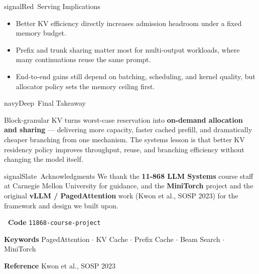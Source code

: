 \documentclass[17pt]{extarticle}
\newlength{\PosterColumnHeight}
\newcommand{\bodycopy}{\fontsize{31.5}{36.8}\selectfont}
\newcommand{\blockgap}{\par\vspace{1.2mm plus 0.55fill}}
\newenvironment{postercolumn}{%
\begin{minipage}[t][\PosterColumnHeight][s]{0.321\linewidth}
\vspace{0pt}%
}{%
\end{minipage}%
}
\begin{document}
\begin{postercolumn}
\blockgap

\begin{posterbox}{signalRed}{\faServer\ Serving Implications}
\bodycopy
\begin{itemize}
      \item Better KV efficiency directly increases admission headroom under a fixed memory budget.
      \item Prefix and trunk sharing matter most for multi-output workloads, where many continuations reuse the same prompt.
      \item End-to-end gains still depend on batching, scheduling, and kernel quality, but allocator policy sets the memory ceiling first.
\end{itemize}
\end{posterbox}

\blockgap

\begin{posterbox}{navyDeep}{\faFlag\ Final Takeaway}
{\fontsize{30}{36}\selectfont
Block-granular KV turns worst-case reservation into \textbf{on-demand allocation and sharing} --- delivering more capacity, faster cached prefill, and dramatically cheaper branching from one mechanism. The systems lesson is that better KV residency policy improves throughput, reuse, and branching efficiency without changing the model itself.\par}
\end{posterbox}

\blockgap

\begin{posterbox}{signalSlate}{\faHandshake\ Acknowledgments}
\bodycopy
We thank the \textbf{11-868 LLM Systems} course staff at Carnegie Mellon University for guidance, and the \textbf{MiniTorch} project and the original \textbf{vLLM / PagedAttention} work (Kwon et al., SOSP 2023) for the framework and design we built upon.
\end{posterbox}
\end{postercolumn}

\vspace{0.4mm}

\begin{tcolorbox}[enhanced, arc=4mm,
      colback=navyDeep, colframe=navyDeep, boxrule=0pt,
      left=14mm, right=14mm, top=2.6mm, bottom=2.6mm,
      before skip=0pt, after skip=0pt]
\color{white}\normalsize
\begin{minipage}[t]{0.30\linewidth}
\textbf{\faGithub\ Code} \texttt{11868-course-project}
\end{minipage}\hfill
\begin{minipage}[t]{0.42\linewidth}\centering
\textbf{Keywords} \; PagedAttention \;\(\cdot\)\; KV Cache \;\(\cdot\)\; Prefix Cache \;\(\cdot\)\; Beam Search \;\(\cdot\)\; MiniTorch
\end{minipage}\hfill
\begin{minipage}[t]{0.24\linewidth}\raggedleft
\textbf{Reference} \; Kwon et al., SOSP 2023
\end{minipage}
\end{tcolorbox}
\end{document}
